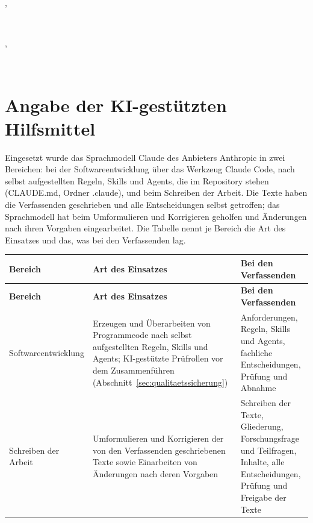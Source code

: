 \noindent
\begin{minipage}[b]{0.45\textwidth}
	\AbgabeOrt, \AbgabeDatum
\end{minipage}
\hfill
\begin{minipage}[b]{0.45\textwidth}
	\\
	\AutorEins
\end{minipage}

\vspace{1.5cm}

\noindent
\begin{minipage}[b]{0.45\textwidth}
	\AbgabeOrt, \AbgabeDatum
\end{minipage}
\hfill
\begin{minipage}[b]{0.45\textwidth}
	\\
	\AutorZwei
\end{minipage}

\clearpage

\section*{Angabe der KI-gestützten Hilfsmittel}

Eingesetzt wurde das Sprachmodell Claude des Anbieters Anthropic in zwei Bereichen: bei der Softwareentwicklung über das Werkzeug Claude Code, nach selbst aufgestellten Regeln, Skills und Agents, die im Repository stehen (CLAUDE.md, Ordner .claude), und beim Schreiben der Arbeit. Die Texte haben die Verfassenden geschrieben und alle Entscheidungen selbst getroffen; das Sprachmodell hat beim Umformulieren und Korrigieren geholfen und Änderungen nach ihren Vorgaben eingearbeitet. Die Tabelle nennt je Bereich die Art des Einsatzes und das, was bei den Verfassenden lag.

\begingroup
\footnotesize
\setlength{\tabcolsep}{4pt}
\renewcommand{\arraystretch}{1.1}
\setlength{\LTcapwidth}{\textwidth}
\begin{longtable}{@{}L{2.6cm}L{6.2cm}L{5.8cm}@{}}
	\toprule
	\textbf{Bereich} & \textbf{Art des Einsatzes} & \textbf{Bei den Verfassenden} \\
	\midrule
	\endfirsthead
	\toprule
	\textbf{Bereich} & \textbf{Art des Einsatzes} & \textbf{Bei den Verfassenden} \\
	\midrule
	\endhead
	\bottomrule
	\endfoot
	Software\-entwicklung & Erzeugen und Überarbeiten von Programmcode nach selbst aufgestellten Regeln, Skills und Agents; KI-gestützte Prüfrollen vor dem Zusammenführen (Abschnitt~\ref{sec:qualitaetssicherung}) & Anforderungen, Regeln, Skills und Agents, fachliche Entscheidungen, Prüfung und Abnahme \\
	\zeilenlinie
	Schreiben der Arbeit & Umformulieren und Korrigieren der von den Verfassenden geschriebenen Texte sowie Einarbeiten von Änderungen nach deren Vorgaben & Schreiben der Texte, Gliederung, Forschungsfrage und Teilfragen, Inhalte, alle Entscheidungen, Prüfung und Freigabe der Texte \\
\end{longtable}
\endgroup

